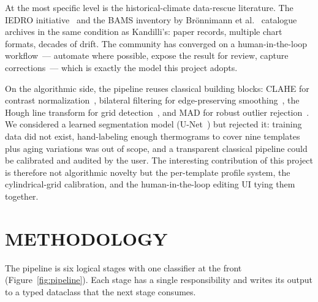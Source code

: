 \documentclass[a4paper,12pt]{report}
\begin{document}
At the most specific level is the historical-climate data-rescue literature. The IEDRO initiative~\cite{iedro} and the BAMS inventory by Br{\"o}nnimann et al.~\cite{cruz2019atmospheric} catalogue archives in the same condition as Kandilli's: paper records, multiple chart formats, decades of drift. The community has converged on a human-in-the-loop workflow~--- automate where possible, expose the result for review, capture corrections~--- which is exactly the model this project adopts.

On the algorithmic side, the pipeline reuses classical building blocks: CLAHE for contrast normalization~\cite{zuiderveld1994clahe}, bilateral filtering for edge-preserving smoothing~\cite{tomasi1998bilateral}, the Hough line transform for grid detection~\cite{duda1972hough}, and MAD for robust outlier rejection~\cite{leys2013mad}. We considered a learned segmentation model (U-Net~\cite{ronneberger2015unet}) but rejected it: training data did not exist, hand-labeling enough thermograms to cover nine templates plus aging variations was out of scope, and a transparent classical pipeline could be calibrated and audited by the user. The interesting contribution of this project is therefore not algorithmic novelty but the per-template profile system, the cylindrical-grid calibration, and the human-in-the-loop editing UI tying them together.

\chapter{METHODOLOGY}

The pipeline is six logical stages with one classifier at the front (Figure~\ref{fig:pipeline}). Each stage has a single responsibility and writes its output to a typed dataclass that the next stage consumes.
\end{document}
